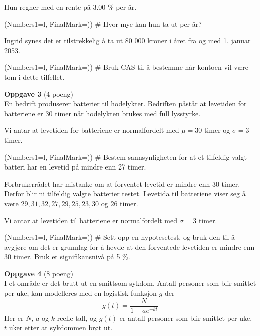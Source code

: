 \documentclass[12pt, a4paper]{article}
\begin{document}
Hun regner med en rente på 3.00 \% per år.
\begin{easylist}
	\ListProperties(Numbers1=l, FinalMark={)})
	# Hvor mye kan hun ta ut per år?
\end{easylist}
Ingrid synes det er tilstrekkelig å ta ut 80 000 kroner
i året fra og med 1. januar 2053.
\begin{easylist}
	\ListProperties(Numbers1=l, FinalMark={)})
	# Bruk CAS til å bestemme når kontoen 
	vil være tom i dette tilfellet.
\end{easylist}
\vfill
\clearpage
{\bfseries \large Oppgave 3} (4 poeng) \vspace*{1em} \\
En bedrift produserer batterier til hodelykter.
Bedriften påstår at levetiden for batteriene
er 30 timer når hodelykten brukes med full lysstyrke.

Vi antar at levetiden for batteriene er normalfordelt
med $\mu = 30$ timer og $\sigma = 3$ timer.
\begin{easylist}[enumerate]
	\ListProperties(Numbers1=l, FinalMark={)})
	# Bestem sannsynligheten for at et tilfeldig valgt
	batteri har en levetid på mindre enn 27 timer.
\end{easylist}

Forbrukerrådet har mistanke om at forventet levetid er mindre
enn 30 timer. Derfor blir ni tilfeldig valgte batterier testet.
Levetida til batteriene viser seg å være
$29, 31, 32, 27, 29, 25, 23, 30$ og $26$ timer.

Vi antar at levetiden til batteriene er normalfordelt med
$\sigma = 3$ timer.

\begin{easylist}
	\ListProperties(Numbers1=l, FinalMark={)})
	# Sett opp en hypotesetest, og bruk den til å avgjøre
	om det er grunnlag for å hevde at den forventede levetiden
	er mindre enn 30 timer. Bruk et signifikansnivå på 5 \%.
\end{easylist}
\vfill
\vspace*{2em}
{\bfseries \large Oppgave 4} (8 poeng) \vspace*{1em} \\
I et område er det brutt ut en smittsom sykdom.
Antall personer som blir smittet per uke,
kan modelleres med en logistisk funksjon $g$ der
\begin{equation*}
	g(t) = \frac{N}{1 + ae^{-kt}}
\end{equation*}
Her er $N$, $a$ og $k$ reelle tall, og $g(t)$ er antall personer
som blir smittet per uke, $t$ uker etter at sykdommen
brøt ut.
\end{document}
